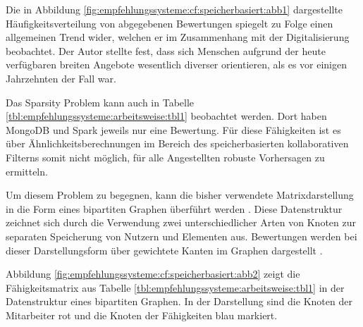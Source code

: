 Die in Abbildung \ref{fig:empfehlungssysteme:cf:speicherbasiert:abb1} dargestellte Häufigkeitsverteilung von abgegebenen Bewertungen spiegelt \textcite[S. 1ff.]{anderson:2007} zu Folge einen allgemeinen Trend wider, welchen er im Zusammenhang mit der Digitalisierung beobachtet. Der Autor stellte fest, dass sich Menschen aufgrund der heute verfügbaren breiten Angebote wesentlich diverser orientieren, als es vor einigen Jahrzehnten der Fall war.

Das Sparsity Problem kann auch in Tabelle \ref{tbl:empfehlungssysteme:arbeitsweise:tbl1} beobachtet werden. Dort haben MongoDB und Spark jeweils nur eine Bewertung. Für diese Fähigkeiten ist es über Ähnlichkeitsberechnungen im Bereich des speicherbasierten kollaborativen Filterns somit nicht möglich, für alle Angestellten robuste Vorhersagen zu ermitteln.

Um diesem Problem zu begegnen, kann die bisher verwendete Matrixdarstellung in die Form eines bipartiten Graphen überführt werden \cite[S. 2f.]{huang:2004}. Diese Datenstruktur zeichnet sich durch die Verwendung zwei unterschiedlicher Arten von Knoten zur separaten Speicherung von Nutzern und Elementen aus. Bewertungen werden bei dieser Darstellungsform über gewichtete Kanten im Graphen dargestellt \cite[S. 1f.]{cao:2021}.

Abbildung \ref{fig:empfehlungssysteme:cf:speicherbasiert:abb2} zeigt die Fähigkeitsmatrix aus Tabelle \ref{tbl:empfehlungssysteme:arbeitsweise:tbl1} in der Datenstruktur eines bipartiten Graphen. In der Darstellung sind die Knoten der Mitarbeiter rot und die Knoten der Fähigkeiten blau markiert.

